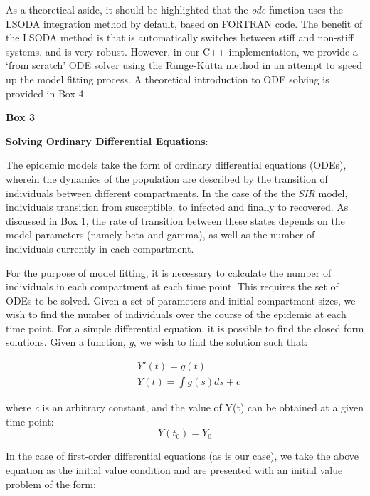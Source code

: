 \documentclass[11pt, a4paper, oneside,titlepage]{article}
\begin{document}
As a theoretical aside, it should be highlighted that the
\emph{ode} function uses the LSODA integration method by default,
based on FORTRAN code. The benefit of the LSODA method is that is
automatically switches between stiff and non-stiff systems, and is
very robust. However, in our C++ implementation, we provide a `from
scratch' ODE solver using the Runge-Kutta method in an attempt to
speed up the model fitting process. A theoretical introduction to ODE
solving is provided in Box 4.  

\newpage
\begin{framed}
{\begin{center}{\bf Box 3}\end{center}}
{\bf Solving Ordinary Differential Equations}:

The epidemic models take the form of ordinary differential
equations (ODEs), wherein the dynamics of the population are described by the
transition of individuals between different compartments. In the case
of the the \emph{SIR} model, individuals transition from susceptible,
to infected and finally to recovered. As discussed in Box 1, the rate
of transition between these states depends on the model parameters
(namely beta and gamma), as well as the number of individuals
currently in each compartment. 

For the purpose of model fitting, it is necessary to calculate the
number of individuals in each compartment at each time point. This
requires the set of ODEs to be solved. Given a set of parameters and
initial compartment sizes, we wish to find the number of individuals
over the course of the epidemic at each time point. For a simple
differential equation, it is possible to find the closed form
solutions. Given a function, \emph{g}, we wish to find the solution
such that:

\begin{equation}
\begin{split}
  &Y'(t) = g(t)\\
  &Y(t) = \int g(s)ds+c
\end{split}
\end{equation}

where \emph{c} is an arbitrary constant, and the value of Y(t) can be
obtained at a given time point: \begin{equation} Y(t_0) = Y_0 \end{equation}

In the case of
first-order differential equations (as is our case), we take the above
equation as the initial value condition and are presented
with an initial value problem of the form:\cite{atkinson} 


\end{framed}
\end{document}
